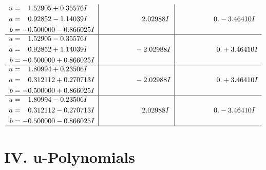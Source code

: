 \documentclass[1p]{elsarticle_modified}
\theoremstyle{definition}
\begin{document}
$$\begin{array}{c|c|c}
\begin{aligned}
u &= \phantom{-}1.52905 + 0.35576 I \\
a &= \phantom{-}0.92852 - 1.14039 I \\
b &= -0.500000 - 0.866025 I\end{aligned}
 & \phantom{-0.000000 -}2.02988 I & \phantom{-0.000000 } 0. - 3.46410 I \\ \hline\begin{aligned}
u &= \phantom{-}1.52905 - 0.35576 I \\
a &= \phantom{-}0.92852 + 1.14039 I \\
b &= -0.500000 + 0.866025 I\end{aligned}
 & \phantom{-0.000000 } -2.02988 I & \phantom{-0.000000 -}0. + 3.46410 I \\ \hline\begin{aligned}
u &= \phantom{-}1.80994 + 0.23506 I \\
a &= \phantom{-}0.312112 + 0.270713 I \\
b &= -0.500000 + 0.866025 I\end{aligned}
 & \phantom{-0.000000 } -2.02988 I & \phantom{-0.000000 -}0. + 3.46410 I \\ \hline\begin{aligned}
u &= \phantom{-}1.80994 - 0.23506 I \\
a &= \phantom{-}0.312112 - 0.270713 I \\
b &= -0.500000 - 0.866025 I\end{aligned}
 & \phantom{-0.000000 -}2.02988 I & \phantom{-0.000000 } 0. - 3.46410 I\\
 \hline 
 \end{array}$$\newpage
\newpage\renewcommand{\arraystretch}{1}
\centering \section*{ IV. u-Polynomials}
\end{document}
